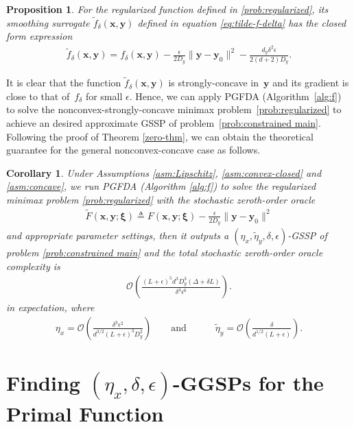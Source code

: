 \documentclass[11pt]{article}
\def\vx{\mathbf{x}}
\def\vy{\mathbf{y}}
\def\vxi{\bm{\xi}}
\def\fO{{\mathcal{O}}}
\newtheorem{proposition}{Proposition}
\newtheorem{corollary}[theorem]{Corollary}
\begin{document}
\begin{proposition}\label{prop: the smoothed function of the regularized}
    For the regularized function defined in \eqref{prob:regularized}, its smoothing surrogate $\tilde{f}_\delta(\vx,\vy)$ defined in equation \eqref{eq:tilde-f-delta} has the closed form expression
    \begin{align}
    \tilde{f}_\delta(\vx,\vy)=f_\delta(\vx,\vy)-\frac{\epsilon}{2D_y}\|\vy-\vy_0\|^2-\frac{d_y\delta^2\epsilon}{2(d+2)D_y}.
    \end{align}
\end{proposition}
It is clear that the function $\tilde{f}_\delta(\vx,\vy)$ is strongly-concave in~$\vy$ and its gradient is close to that of~$f_\delta$ for small $\epsilon$.
Hence, we can apply PGFDA (Algorithm~\ref{alg:f}) to solve the nonconvex-strongly-concave minimax problem~\eqref{prob:regularized} to achieve an desired approximate GSSP of problem~\eqref{prob:constrained main}.
Following the proof of Theorem \ref{zero-thm}, we can obtain the theoretical guarantee for the general nonconvex-concave case as follows.



 
\begin{corollary}\label{thm: complexity of f: concave}    
Under Assumptions \ref{asm:Lipschitz}, \ref{asm:convex-closed} and \ref{asm:concave}, we run PGFDA (Algorithm \ref{alg:f}) to solve the regularized minimax problem \eqref{prob:regularized} with the stochastic zeroth-order oracle 
\begin{align*}
\tilde F(\vx,\vy;\vxi) \triangleq F(\vx,\vy;\vxi)-\frac{\epsilon}{2D_y}\|\vy-\vy_0\|^2
\end{align*}
and appropriate parameter settings, then it outputs a $(\eta_x,\tilde\eta_y,\delta,\epsilon)$-GSSP of problem \eqref{prob:constrained main}
and the total stochastic zeroth-order oracle complexity is
\begin{align*}
\fO\left(\frac{(L+\epsilon)^5 d^{3}D_y^3 (\Delta+\delta L)}{ \delta^4 \epsilon^6}\right).     
\end{align*}
in expectation, where 
\begin{align*}    \eta_x=\fO\left(\frac{\delta^3\epsilon^2}{d^{3/2}(L+\epsilon)^3D_y^2}\right)
\qquad\text{and}\qquad
\quad\tilde\eta_y=\fO\left(\frac{\delta}{d^{1/2}(L+\epsilon)}\right).
\end{align*}
\end{corollary}




\section{Finding $(\eta_x,\delta,\epsilon)$-GGSPs for the Primal Function}\label{sec: Phi}
\end{document}
